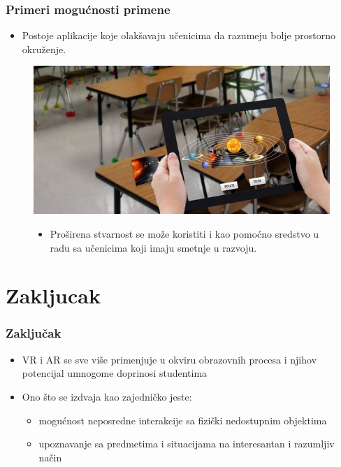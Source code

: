\documentclass[9pt]{beamer}
\begin{document}
 \begin{frame}
 \frametitle{Primeri mogućnosti primene}
            \begin{itemize}
            \setlength\itemsep{1.5em}
		\item Postoje aplikacije koje olakšavaju učenicima da razumeju bolje prostorno okruženje. 
            \end{itemize}
            \begin{figure}[h!]
		\begin{center}
		\includegraphics[scale=0.3]{primer.jpg}
		\end{center}
  \begin{itemize}
		\item Proširena stvarnost se može koristiti i kao pomoćno sredstvo u radu sa učenicima koji imaju smetnje u razvoju.
            \end{itemize}
		
		\end{figure}
\end{frame}
\section{Zakljucak}

\begin{frame}[fragile]\frametitle{Zaključak}
	
		\begin{itemize}
  \setlength\itemsep{1.5em}
			\item VR i AR se sve više primenjuje u okviru obrazovnih procesa i njihov potencijal umnogome doprinosi studentima
			\item Ono što se izdvaja kao zajedničko jeste:
   
   \begin{itemize}
   \item mogućnost neposredne interakcije sa fizički nedostupnim objektima 
    \item upoznavanje sa predmetima i situacijama na interesantan i razumljiv način
   
\end{itemize}

  
		\end{itemize}

\end{frame}
\end{document}

